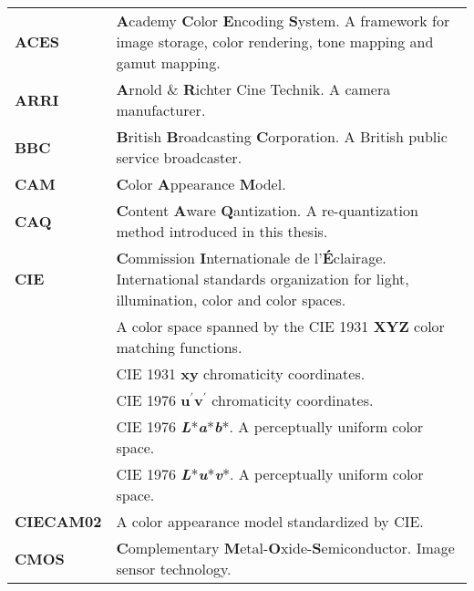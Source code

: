\begin{flushleft}
\renewcommand*{\arraystretch}{1.75}
\begin{longtable}[c]{@{}p{28.5mm}@{} p{120.5mm}}
	\textbf{ACES}	& \textbf{A}cademy \textbf{C}olor \textbf{E}ncoding \textbf{S}ystem. A framework for image storage, color rendering, tone mapping and gamut mapping.\\
	\textbf{ARRI}	& \textbf{A}rnold \& \textbf{R}ichter Cine Technik. A camera manufacturer.\\
	\textbf{BBC}    & \textbf{B}ritish \textbf{B}roadcasting \textbf{C}orporation. A British public service broadcaster.\\
	\textbf{CAM}	& \textbf{C}olor \textbf{A}ppearance \textbf{M}odel.\\
	\textbf{CAQ}	& \textbf{C}ontent \textbf{A}ware \textbf{Q}antization. A re-quantization method introduced in this thesis.\\
	\textbf{CIE}	& \textbf{C}ommission \textbf{I}nternationale de l'\textbf{É}clairage. International standards organization for light, illumination, color and color spaces.\\
	\textbf{\XYZ}	& A color space spanned by the CIE 1931 \textbf{XYZ} color matching functions.\\
	\textbf{\xy}	& CIE 1931 \textbf{xy} chromaticity coordinates.\\
	\textbf{\uv}	& CIE 1976 \textbf{u$^\prime$v$^\prime$} chromaticity coordinates.\\
	\textbf{\Lab}	& CIE 1976 \textbf{\textit{L}}*\textbf{\textit{a}}*\textbf{\textit{b}}*. A perceptually uniform color space.\\
	\textbf{\Luv}	& CIE 1976 \textbf{\textit{L}}*\textbf{\textit{u}}*\textbf{\textit{v}}*. A perceptually uniform color space.\\
	\textbf{CIECAM02}	& A color appearance model standardized by CIE.\\
	\textbf{CMOS}	& \textbf{C}omplementary \textbf{M}etal-\textbf{O}xide-\textbf{S}emiconductor. Image sensor technology.\\

\end{longtable}
\end{flushleft}
